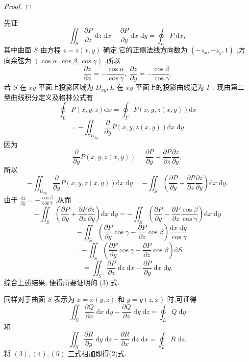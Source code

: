 \begin{proof}

\end{proof}
先证
\[
{\iint }_{S}\frac{\partial P}{\partial z}\mathrm{\;d}z\mathrm{\;d}x - \frac{\partial P}{\partial y}\mathrm{\;d}x\mathrm{\;d}y = {\oint }_{L}P\mathrm{\;d}x, \tag{3}
\]
其中曲面 \(S\) 由方程 \(z = z\left( {x,y}\right)\) 确定,它的正侧法线方向数为 \(\left( {-{z}_{x}, - {z}_{y},1}\right)\) ,方向余弦为 \(\left( {\cos \alpha ,\cos \beta ,\cos \gamma }\right)\) ,所以
\[
\frac{\partial z}{\partial x} =  - \frac{\cos \alpha }{\cos \gamma },\;\frac{\partial z}{\partial y} =  - \frac{\cos \beta }{\cos \gamma }.
\]
若 \(S\) 在 \({xy}\) 平面上投影区域为 \({D}_{xy},L\) 在 \({xy}\) 平面上的投影曲线记为 \(\Gamma\) . 现由第二型曲线积分定义及格林公式有
\[
{\oint }_{L}P\left( {x,y,z}\right) \mathrm{d}x = {\oint }_{\Gamma }P\left( {x,y,z\left( {x,y}\right) }\right) \mathrm{d}x
\]
\[
=  - {\iint }_{{D}_{xy}}\frac{\partial }{\partial y}P\left( {x,y,z\left( {x,y}\right) }\right) \mathrm{d}x\mathrm{\;d}y.
\]
因为
\[
\frac{\partial }{\partial y}P\left( {x,y,z\left( {x,y}\right) }\right)  = \frac{\partial P}{\partial y} + \frac{\partial P}{\partial z}\frac{\partial z}{\partial y},
\]
所以
\[
- {\iint }_{{D}_{xy}}\frac{\partial }{\partial y}P\left( {x,y,z\left( {x,y}\right) }\right) \mathrm{d}x\mathrm{\;d}y =  - {\iint }_{S}\left( {\frac{\partial P}{\partial y} + \frac{\partial P}{\partial z}\frac{\partial z}{\partial y}}\right) \mathrm{d}x\mathrm{\;d}y.
\]
由于 \(\frac{\partial z}{\partial y} =  - \frac{\cos \beta }{\cos \gamma }\) ,从而
\[
- {\iint }_{S}\left( {\frac{\partial P}{\partial y} + \frac{\partial P}{\partial z}\frac{\partial z}{\partial y}}\right) \mathrm{d}x\mathrm{\;d}y =  - {\iint }_{S}\left( {\frac{\partial P}{\partial y} - \frac{\partial P}{\partial z}\frac{\cos \beta }{\cos \gamma }}\right) \mathrm{d}x\mathrm{\;d}y
\]
\[
=  - {\iint }_{S}\left( {\frac{\partial P}{\partial y}\cos \gamma  - \frac{\partial P}{\partial z}\cos \beta }\right) \frac{\mathrm{d}x\mathrm{\;d}y}{\cos \gamma }
\]
\[
=  - {\iint }_{S}\left( {\frac{\partial P}{\partial y}\cos \gamma  - \frac{\partial P}{\partial z}\cos \beta }\right) \mathrm{d}S
\]
\[
= {\iint }_{S}\frac{\partial P}{\partial z}\mathrm{\;d}z\mathrm{\;d}x - \frac{\partial P}{\partial y}\mathrm{\;d}x\mathrm{\;d}y.
\]
综合上述结果, 便得所要证明的 (3) 式.

同样对于曲面 \(S\) 表示为 \(x = x\left( {y,z}\right)\) 和 \(y = y\left( {z,x}\right)\) 时,可证得
\[
{\iint }_{S}\frac{\partial Q}{\partial x}\mathrm{\;d}x\mathrm{\;d}y - \frac{\partial Q}{\partial z}\mathrm{\;d}y\mathrm{\;d}z = {\oint }_{L}Q\mathrm{\;d}y \tag{4}
\]
和
\[
{\iint }_{S}\frac{\partial R}{\partial y}\mathrm{\;d}y\mathrm{\;d}z - \frac{\partial R}{\partial x}\mathrm{\;d}z\mathrm{\;d}x = {\oint }_{L}R\mathrm{\;d}z. \tag{5}
\]
将 \(\left( 3\right) ,\left( 4\right) ,\left( 5\right)\) 三式相加即得(2)式.

